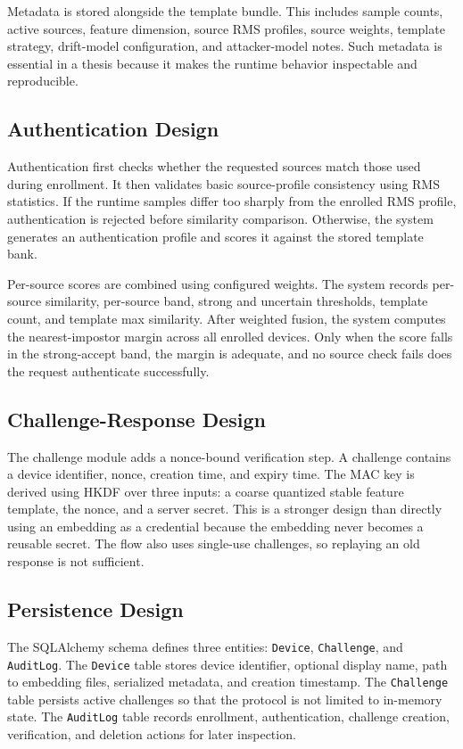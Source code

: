 \documentclass[12pt]{report}
\begin{document}
Metadata is stored alongside the template bundle. This includes sample counts, active sources, feature dimension, source RMS profiles, source weights, template strategy, drift-model configuration, and attacker-model notes. Such metadata is essential in a thesis because it makes the runtime behavior inspectable and reproducible.

\subsection{Authentication Design}
Authentication first checks whether the requested sources match those used during enrollment. It then validates basic source-profile consistency using RMS statistics. If the runtime samples differ too sharply from the enrolled RMS profile, authentication is rejected before similarity comparison. Otherwise, the system generates an authentication profile and scores it against the stored template bank.

Per-source scores are combined using configured weights. The system records per-source similarity, per-source band, strong and uncertain thresholds, template count, and template max similarity. After weighted fusion, the system computes the nearest-impostor margin across all enrolled devices. Only when the score falls in the strong-accept band, the margin is adequate, and no source check fails does the request authenticate successfully.

\subsection{Challenge-Response Design}
The challenge module adds a nonce-bound verification step. A challenge contains a device identifier, nonce, creation time, and expiry time. The MAC key is derived using HKDF over three inputs: a coarse quantized stable feature template, the nonce, and a server secret. This is a stronger design than directly using an embedding as a credential because the embedding never becomes a reusable secret. The flow also uses single-use challenges, so replaying an old response is not sufficient.

\subsection{Persistence Design}
The SQLAlchemy schema defines three entities: \texttt{Device}, \texttt{Challenge}, and \texttt{AuditLog}. The \texttt{Device} table stores device identifier, optional display name, path to embedding files, serialized metadata, and creation timestamp. The \texttt{Challenge} table persists active challenges so that the protocol is not limited to in-memory state. The \texttt{AuditLog} table records enrollment, authentication, challenge creation, verification, and deletion actions for later inspection.
\end{document}
